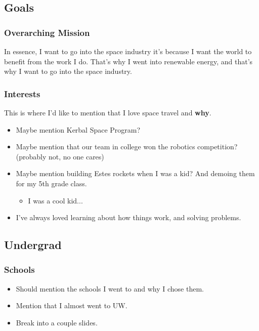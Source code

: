 \documentclass[aspectratio=169]{beamer}
\begin{document}
\subsection{Goals}
\begin{frame}
  \frametitle{Overarching Mission}
  In essence, I want to go into the space industry it's because I want the world to benefit from the work I do.  That's why I went into renewable energy, and that's why I want to go into the space industry.
\end{frame}

\begin{frame}
  \frametitle{Interests} This is where I'd like to mention that I love
  space travel and \textbf{why}.
  \begin{itemize}
  \item Maybe mention Kerbal Space Program?
  \item Maybe mention that our team in college won the robotics
    competition?  (probably not, no one cares)
  \item Maybe mention building Estes rockets when I was a kid?  And
    demoing them for my 5th grade class.
    \begin{itemize}
    \item I was a cool kid...
    \end{itemize}
  \item I've always loved learning about how things work,
    and solving problems.
  \end{itemize}
\end{frame}

\subsection{Undergrad}
\begin{frame}
  \frametitle{Schools}
  \begin{itemize}
  \item Should mention the schools I went to and why I chose them.
  \item Mention that I almost went to UW.
  \item Break into a couple slides.
  \end{itemize}
\end{frame}
\end{document}
